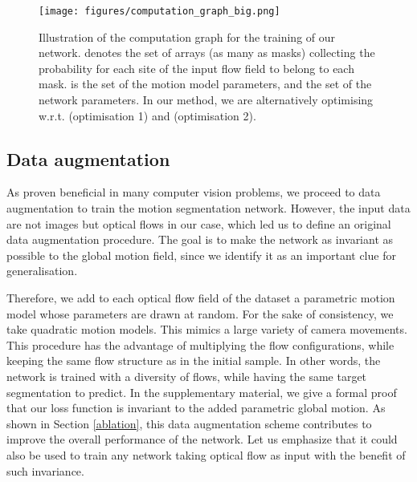\documentclass[10pt,twocolumn,letterpaper]{article}
\begin{document}
\begin{figure}[h!]
\texttt{[image: figures/computation\_graph\_big.png]}
\caption{Illustration of the computation graph for the training of our network.  denotes the set of arrays (as many as masks) collecting the probability for each site of the input flow field to belong to each mask.  is the set of the motion model parameters, and  the set of the network parameters. In our method, we are alternatively optimising w.r.t.  (optimisation 1) and  (optimisation 2).}
\label{fig:computationgraph}
 \vspace{-0.1cm}
\end{figure}

\subsection{Data augmentation}
\label{augmentation}
As proven beneficial in many computer vision problems, we proceed to data augmentation to train the motion segmentation network. However, the input data are not images but optical flows in our case, which led us to define an original data augmentation procedure. The goal is to make the network as invariant as possible to the global motion field, since we identify it as an important clue for generalisation.

Therefore, we add to each optical flow field of the dataset a parametric motion model whose parameters are drawn at random. For the sake of consistency, we take quadratic motion models. This mimics a large variety of camera movements. This procedure has the advantage of multiplying the flow configurations, while keeping the same flow structure as in the initial sample. In other words, the network is trained with a diversity of flows, while having the same target segmentation to predict. In the supplementary material, we give a formal proof that our loss function is invariant to the added parametric global motion. As shown in Section \ref{ablation}, this data augmentation scheme contributes to improve the overall performance of the network. Let us emphasize that it could also be used to train any network taking optical flow as input with the benefit of such invariance.
\end{document}
